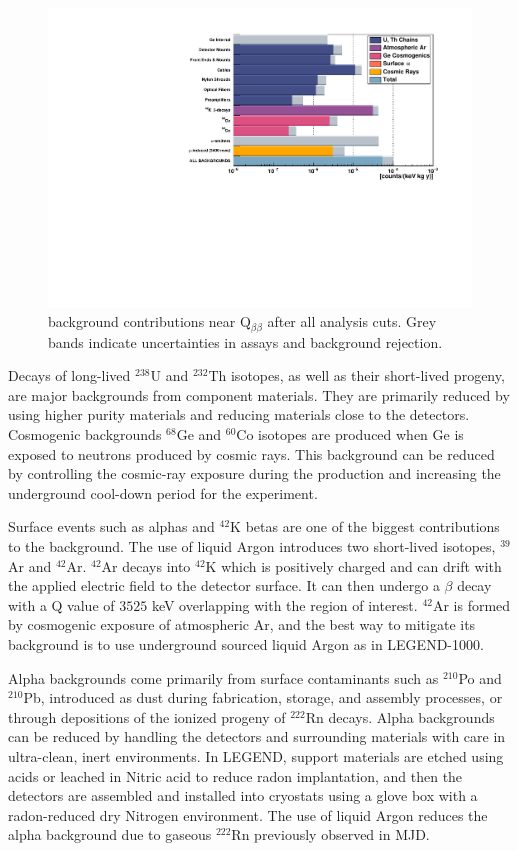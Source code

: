 \begin{figure}
\centering
  \includegraphics[scale=0.6]{ch2/figs/L200_background.pdf}
  \caption{{\Ltwo} background contributions near Q$_{\beta\beta}$ after all analysis cuts. Grey bands indicate uncertainties in assays and background rejection.}
\label{fig:L200_background}
  \end{figure}
  
Decays of long-lived $^{238}$U and $^{232}$Th isotopes, as well as their short-lived progeny, are major backgrounds from component materials. They are primarily reduced by using higher purity materials and reducing materials close to the detectors. Cosmogenic backgrounds $^{68}$Ge and $^{60}$Co isotopes are produced when Ge is exposed to neutrons produced by cosmic rays. This background can be reduced by controlling the cosmic-ray exposure during the production and increasing the underground cool-down period for the experiment. 

Surface events such as alphas and $^{42}$K betas are one of the biggest contributions to the background. The use of liquid Argon introduces two short-lived isotopes, $^{39}$Ar and $^{42}$Ar.  $^{42}$Ar decays into $^{42}$K which is positively charged and can drift with the applied electric field to the detector surface. It can then undergo a $\beta$ decay with a Q value of $3525$ keV overlapping with the region of interest. $^{42}$Ar is formed by cosmogenic exposure of atmospheric Ar, and the best way to mitigate its background is to use underground sourced liquid Argon as in LEGEND-1000.

Alpha backgrounds come primarily from surface contaminants such as $^{210}$Po and $^{210}$Pb, introduced as dust during fabrication, storage, and assembly processes, or through depositions of the ionized progeny of $^{222}$Rn decays. Alpha backgrounds can be reduced by handling the detectors and surrounding materials with care in ultra-clean, inert environments. In LEGEND, support materials are etched using acids or leached in Nitric acid to reduce radon implantation, and then the detectors are assembled and installed into cryostats using a glove box with a radon-reduced dry Nitrogen environment. The use of liquid Argon reduces the alpha background due to gaseous $^{222}$Rn previously observed in MJD.

